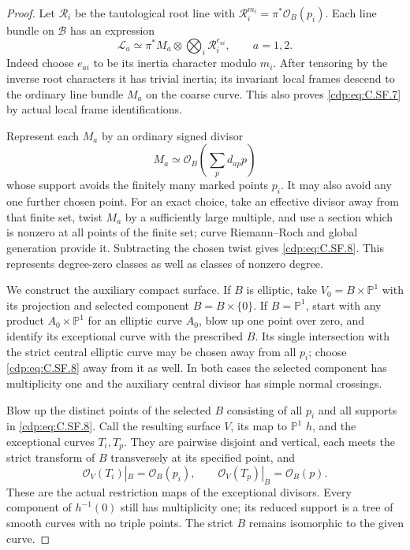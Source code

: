 \begin{proof}
Let $\mathcal R_i$ be the tautological
root line with
$\mathcal R_i^{m_i}=\pi^*\mathcal O_B(p_i)$.
Each line bundle on $\mathcal B$ has
an expression
\[
 \mathcal L_a\simeq\pi^*M_a\otimes
                  \bigotimes_i\mathcal R_i^{e_{ai}},
                  \qquad a=1,2.
                                                               \tag{C.SF.7}\label{cdp:eq:C.SF.7}
\]
Indeed choose $e_{ai}$ to be its
inertia character modulo $m_i$.
After tensoring by the inverse root
characters it has trivial inertia;
its invariant local frames descend
to the ordinary line bundle $M_a$
on the coarse curve. This also
proves \eqref{cdp:eq:C.SF.7} by actual local
frame identifications.

Represent each $M_a$ by an ordinary
signed divisor
\[
                        M_a\simeq\mathcal O_B\left(
                                    \sum_p d_{ap}p\right)
                                                               \tag{C.SF.8}\label{cdp:eq:C.SF.8}
\]
whose support avoids the finitely
many marked points $p_i$. It may
also avoid any one further chosen
point. For an exact choice, take
an effective divisor away from
that finite set, twist $M_a$ by
a sufficiently large multiple,
and use a section which is nonzero
at all points of the finite set;
curve Riemann--Roch and global
generation provide it. Subtracting
the chosen twist gives \eqref{cdp:eq:C.SF.8}.
This represents degree-zero classes
as well as classes of nonzero
degree.

We construct the auxiliary compact
surface. If $B$ is elliptic, take
$V_0=B\times\mathbb P^1$ with its
projection and selected component
$B=B\times\{0\}$. If $B=\mathbb P^1$,
start with any product
$A_0\times\mathbb P^1$ for an
elliptic curve $A_0$, blow up one
point over zero, and identify its
exceptional curve with the prescribed
$B$. Its single intersection with
the strict central elliptic curve
may be chosen away from all $p_i$;
choose \eqref{cdp:eq:C.SF.8} away from it as well.
In both cases the selected component
has multiplicity one and the
auxiliary central divisor has
simple normal crossings.

Blow up the distinct points of
the selected $B$ consisting of
all $p_i$ and all supports in
\eqref{cdp:eq:C.SF.8}. Call the resulting
surface $V$, its map to
$\mathbb P^1$ $h$, and the
exceptional curves $T_i,T_p$.
They are pairwise disjoint and
vertical, each meets the strict
transform of $B$ transversely
at its specified point, and
\[
 \mathcal O_V(T_i)|_B=\mathcal O_B(p_i),
 \qquad\mathcal O_V(T_p)|_B=\mathcal O_B(p).
                                                               \tag{C.SF.9}\label{cdp:eq:C.SF.9}
\]
These are the actual restriction
maps of the exceptional divisors.
Every component of $h^{-1}(0)$
still has multiplicity one; its
reduced support is a tree of
smooth curves with no triple
points. The strict $B$ remains
isomorphic to the given curve.


\end{proof}
